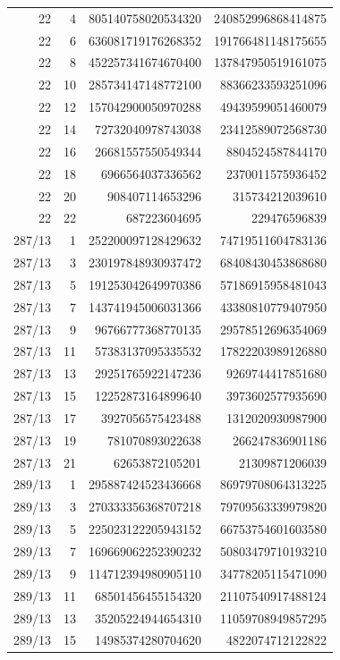 \begin{longtable}{@{}rrrr@{}}
22 & 4 & 805140758020534320 & 240852996868414875\\
22 & 6 & 636081719176268352 & 191766481148175655\\
22 & 8 & 452257341674670400 & 137847950519161075\\
22 & 10 & 285734147148772100 & 88366233593251096\\
22 & 12 & 157042900050970288 & 49439599051460079\\
22 & 14 & 72732040978743038 & 23412589072568730\\
22 & 16 & 26681557550549344 & 8804524587844170\\
22 & 18 & 6966564037336562 & 2370011575936452\\
22 & 20 & 908407114653296 & 315734212039610\\
22 & 22 & 687223604695 & 229476596839\\
287/13 & 1 & 252200097128429632 & 74719511604783136\\
287/13 & 3 & 230197848930937472 & 68408430453868680\\
287/13 & 5 & 191253042649970386 & 57186915958481043\\
287/13 & 7 & 143741945006031366 & 43380810779407950\\
287/13 & 9 & 96766777368770135 & 29578512696354069\\
287/13 & 11 & 57383137095335532 & 17822203989126880\\
287/13 & 13 & 29251765922147236 & 9269744417851680\\
287/13 & 15 & 12252873164899640 & 3973602577935690\\
287/13 & 17 & 3927056575423488 & 1312020930987900\\
287/13 & 19 & 781070893022638 & 266247836901186\\
287/13 & 21 & 62653872105201 & 21309871206039\\
289/13 & 1 & 295887424523436668 & 86979708064313225\\
289/13 & 3 & 270333356368707218 & 79709563339979820\\
289/13 & 5 & 225023122205943152 & 66753754601603580\\
289/13 & 7 & 169669062252390232 & 50803479710193210\\
289/13 & 9 & 114712394980905110 & 34778205115471090\\
289/13 & 11 & 68501456455154320 & 21107540917488124\\
289/13 & 13 & 35205224944654310 & 11059708949857295\\
289/13 & 15 & 14985374280704620 & 4822074712122822\\

\end{longtable}
